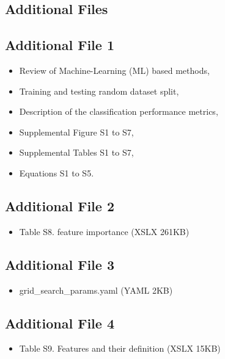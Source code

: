 \documentclass{bmcart}
\begin{document}
\begin{backmatter}
\clearpage

\section*{Additional Files}
\subsection*{Additional File 1} \label{add:figs_tbls}
    
\begin{itemize}
\item Review of Machine-Learning (ML) based methods, \\
\item     Training and testing random dataset split, \\
\item     Description of the classification performance metrics, \\
\item     Supplemental Figure S1 to S7, \\
\item     Supplemental Tables S1 to S7,\\
\item     Equations S1 to S5.
\end{itemize}
   
\subsection*{Additional File 2}  \label{add:feature importance}
  
\begin{itemize}
\item Table S8. feature importance (XSLX 261KB)
\end{itemize}

\subsection*{Additional File 3}  \label{add:hyperoptparams}
\begin{itemize}
\item    grid\_search\_params.yaml (YAML 2KB)
\end{itemize}

\subsection*{Additional File 4}  \label{add:feature_definition}
\begin{itemize}
\item   Table S9. Features and their definition (XSLX 15KB)
\end{itemize}


\end{backmatter}
\end{document}
